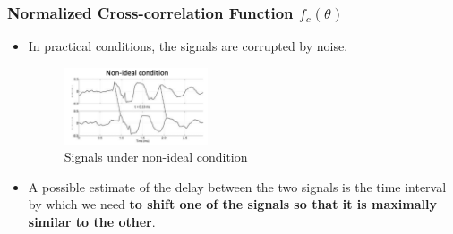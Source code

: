 \documentclass[12pt,a4paper]{article}
\begin{document}

 
\subsubsection{Normalized Cross-correlation Function $f_{c}(\theta)$}
\begin{itemize}
 \item In practical conditions, the signals are corrupted by noise. 
  \begin{figure}[H]\centering \includegraphics[width=0.4\textwidth]{images/nonideal}
   \caption{Signals under non-ideal condition} \end{figure}
 \item A possible estimate of the delay between the two signals is the time interval by which we need \textbf{to shift one of the signals
   so that it is maximally similar to the other}.
\end{itemize}
\end{document}
